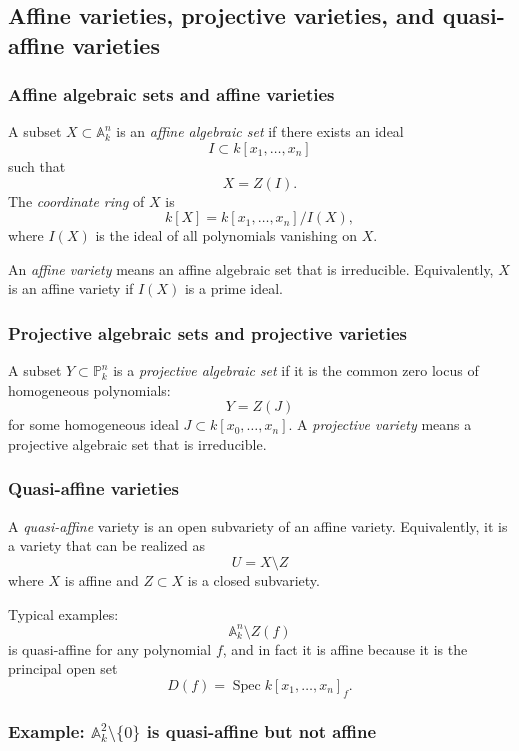 \documentclass[12pt,a4paper]{article}
\theoremstyle{plain}
\theoremstyle{definition}      %
\begin{document}
\subsection*{Affine varieties, projective varieties, and quasi-affine varieties}

\subsubsection*{Affine algebraic sets and affine varieties}

A subset \(X\subset \mathbb A^n_k\) is an \emph{affine algebraic set} if there exists an ideal
\[
I\subset k[x_1,\dots,x_n]
\]
such that
\[
X=Z(I).
\]
The \emph{coordinate ring} of \(X\) is
\[
k[X]=k[x_1,\dots,x_n]/I(X),
\]
where \(I(X)\) is the ideal of all polynomials vanishing on \(X\).

An \emph{affine variety} means an affine algebraic set that is irreducible.
Equivalently, \(X\) is an affine variety if \(I(X)\) is a prime ideal.

\subsubsection*{Projective algebraic sets and projective varieties}

A subset \(Y\subset \mathbb P^n_k\) is a \emph{projective algebraic set} if it is the common zero locus of homogeneous polynomials:
\[
Y=Z(J)
\]
for some homogeneous ideal \(J\subset k[x_0,\dots,x_n]\).
A \emph{projective variety} means a projective algebraic set that is irreducible.

\subsubsection*{Quasi-affine varieties}

A \emph{quasi-affine} variety is an open subvariety of an affine variety.
Equivalently, it is a variety that can be realized as
\[
U = X\setminus Z
\]
where \(X\) is affine and \(Z\subset X\) is a closed subvariety.

Typical examples:
\[
\mathbb A^n_k\setminus Z(f)
\]
is quasi-affine for any polynomial \(f\), and in fact it is affine because it is the principal open set
\[
D(f)=\operatorname{Spec}k[x_1,\dots,x_n]_f.
\]

\subsubsection*{Example: \(\mathbb A^2_k\setminus\{0\}\) is quasi-affine but not affine}
\end{document}
